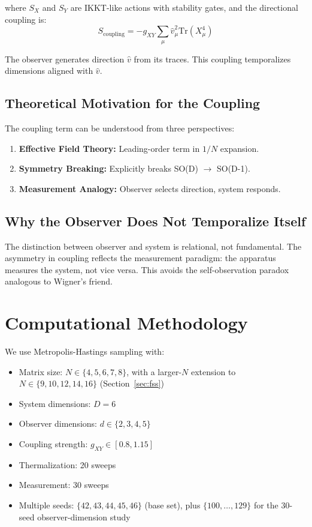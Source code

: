 \documentclass[12pt,a4paper]{article}
\begin{document}
where $S_X$ and $S_Y$ are IKKT-like actions with stability gates, and the 
directional coupling is:
\begin{equation}
S_{\text{coupling}} = -g_{XY} \sum_\mu \hat{v}_\mu^2 \text{Tr}(X_\mu^4)
\end{equation}

The observer generates direction $\hat{v}$ from its traces. This coupling 
temporalizes dimensions aligned with $\hat{v}$.

\subsection{Theoretical Motivation for the Coupling}

The coupling term can be understood from three perspectives:

\begin{enumerate}[leftmargin=*]
\item \textbf{Effective Field Theory:} Leading-order term in $1/N$ expansion.
\item \textbf{Symmetry Breaking:} Explicitly breaks SO(D) $\rightarrow$ SO(D-1).
\item \textbf{Measurement Analogy:} Observer selects direction, system responds.
\end{enumerate}

\subsection{Why the Observer Does Not Temporalize Itself}

The distinction between observer and system is relational, not fundamental. 
The asymmetry in coupling reflects the measurement paradigm: the apparatus 
measures the system, not vice versa. This avoids the self-observation paradox 
analogous to Wigner's friend.

\section{Computational Methodology}\label{sec:method}

We use Metropolis-Hastings sampling with:
\begin{itemize}
\item Matrix size: $N \in \{4, 5, 6, 7, 8\}$, with a larger-$N$ extension to
      $N \in \{9, 10, 12, 14, 16\}$ (Section~\ref{sec:fss})
\item System dimensions: $D = 6$
\item Observer dimensions: $d \in \{2, 3, 4, 5\}$
\item Coupling strength: $g_{XY} \in [0.8, 1.15]$
\item Thermalization: 20 sweeps
\item Measurement: 30 sweeps
\item Multiple seeds: $\{42, 43, 44, 45, 46\}$ (base set), plus
      $\{100,\dots,129\}$ for the $30$-seed observer-dimension study
\end{itemize}
\end{document}
